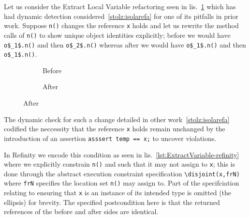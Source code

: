 Let us consider the Extract Local Variable refactoring seen in lis.~\ref{lst:ExtractVariable-java} which has had dynamic detection
considered~\ref{stolz:isolarefa} for one of its pitfalls in prior work. Suppose \lstinline[style=smallJava]|n()| changes the reference
\lstinline[style=smallJava]|x| holds and let us rewrite the method calls of \lstinline[style=smallJava]|n()| to show unique
object identities explicitly; before we would have \lstinline[mathescape=true,style=smallJava]|o$_1$.n()| and then
\lstinline[mathescape=true,style=smallJava]|o$_2$.n()| whereas after we would have \lstinline[mathescape=true,style=smallJava]|o$_1$.n()|
and then \lstinline[mathescape=true,style=smallJava]|o$_1$.n()|.


\begin{figure}[!htb]
  \centering
  \begin{subfigure}{.2\linewidth}
    
    \caption{Before}
  \end{subfigure}\hspace{1cm}
  \begin{subfigure}{.3\linewidth}
    
    \caption{After}
  \end{subfigure}
\label{lst:ExtractVariable-java}
\end{figure}

The dynamic check for such a change detailed in other work~\ref{stolz:isolarefa} codified the neccessity that the reference \lstinline[style=smallJava]|x|
holds remain unchanged by the introduction of an assertion \lstinline[style=smallJava]|asssert temp == x;| to uncover violations.

In Refinity we encode this condition as seen in lis.~\ref{lst:ExtractVariable-refinity} where we explicitly constrain \lstinline[style=refinity]|n()| and
such that it may not assign to \lstinline[style=refinity]|x|; this is done through the abstract execution constraint specification \lstinline[style=refinity]|\disjoint(x,frN)|
where \lstinline[style=refinity]|frN| specifies the location set \lstinline[style=refinity]|n()| may assign to. Part of the specifciation relating to
ensuring that \lstinline[style=refinity]|x| is an instance of its intended type is omitted (the ellipsis) for brevity. The specified postcondition here is that the
returned references of the before and after sides are identical.

